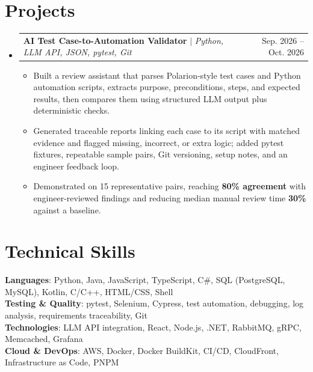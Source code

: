 \documentclass[letterpaper,11pt]{article}
\makeatletter
\newcommand{\resumeItem}[1]{
  \item\small{{#1 \vspace{-2pt}}}
}
\newcommand{\resumeProjectHeading}[2]{
    \item
    \begin{tabular*}{0.97\textwidth}{l@{\extracolsep{\fill}}r}
      \small#1 & #2 \\
    \end{tabular*}\vspace{-7pt}
}
\newcommand{\resumeSubHeadingListStart}{\begin{itemize}[leftmargin=0.15in, label={}]}
\newcommand{\resumeSubHeadingListEnd}{\end{itemize}}
\newcommand{\resumeItemListStart}{\begin{itemize}}
\newcommand{\resumeItemListEnd}{\end{itemize}\vspace{-5pt}}
\makeatother
\begin{document}
\section{Projects}
\resumeSubHeadingListStart
\resumeProjectHeading
{\textbf{AI Test Case-to-Automation Validator} $|$ \emph{Python, LLM API, JSON, pytest, Git}}{Sep. 2026 -- Oct. 2026}
\resumeItemListStart
\resumeItem{Built a review assistant that parses Polarion-style test cases and Python automation scripts, extracts purpose, preconditions, steps, and expected results, then compares them using structured LLM output plus deterministic checks.}
\resumeItem{Generated traceable reports linking each case to its script with matched evidence and flagged missing, incorrect, or extra logic; added pytest fixtures, repeatable sample pairs, Git versioning, setup notes, and an engineer feedback loop.}
\resumeItem{Demonstrated on 15 representative pairs, reaching \textbf{80\% agreement} with engineer-reviewed findings and reducing median manual review time \textbf{30\%} against a baseline.}
\resumeItemListEnd
\resumeSubHeadingListEnd

\section{Technical Skills}
\begin{itemize}[leftmargin=0.15in, label={}]
  \small{\item{
        \textbf{Languages}{: Python, Java, JavaScript, TypeScript, C\#, SQL (PostgreSQL, MySQL), Kotlin, C/C++, HTML/CSS, Shell} \\
        \textbf{Testing \& Quality}{: pytest, Selenium, Cypress, test automation, debugging, log analysis, requirements traceability, Git} \\
        \textbf{Technologies}{: LLM API integration, React, Node.js, .NET, RabbitMQ, gRPC, Memcached, Grafana} \\
        \textbf{Cloud \& DevOps}{: AWS, Docker, Docker BuildKit, CI/CD, CloudFront, Infrastructure as Code, PNPM}
        }}
\end{itemize}
\end{document}

